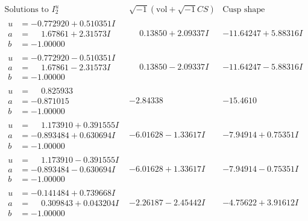 \documentclass[1p]{elsarticle_modified}
\theoremstyle{definition}
\newcommand{\I}{\sqrt{-1}}
\begin{document}
$$\begin{array}{c|c|c}  
\text{Solutions to }I^u_{2}& \I (\text{vol} + \sqrt{-1}CS) & \text{Cusp shape}\\
 \hline 
\begin{aligned}
u &= -0.772920 + 0.510351 I \\
a &= \phantom{-}1.67861 + 2.31573 I \\
b &= -1.00000\phantom{ +0.000000I}\end{aligned}
 & \phantom{-}0.13850 + 2.09337 I & -11.64247 + 5.88316 I \\ \hline\begin{aligned}
u &= -0.772920 - 0.510351 I \\
a &= \phantom{-}1.67861 - 2.31573 I \\
b &= -1.00000\phantom{ +0.000000I}\end{aligned}
 & \phantom{-}0.13850 - 2.09337 I & -11.64247 - 5.88316 I \\ \hline\begin{aligned}
u &= \phantom{-}0.825933\phantom{ +0.000000I} \\
a &= -0.871015\phantom{ +0.000000I} \\
b &= -1.00000\phantom{ +0.000000I}\end{aligned}
 & -2.84338\phantom{ +0.000000I} & -15.4610\phantom{ +0.000000I} \\ \hline\begin{aligned}
u &= \phantom{-}1.173910 + 0.391555 I \\
a &= -0.893484 + 0.630694 I \\
b &= -1.00000\phantom{ +0.000000I}\end{aligned}
 & -6.01628 - 1.33617 I & -7.94914 + 0.75351 I \\ \hline\begin{aligned}
u &= \phantom{-}1.173910 - 0.391555 I \\
a &= -0.893484 - 0.630694 I \\
b &= -1.00000\phantom{ +0.000000I}\end{aligned}
 & -6.01628 + 1.33617 I & -7.94914 - 0.75351 I \\ \hline\begin{aligned}
u &= -0.141484 + 0.739668 I \\
a &= \phantom{-}0.309843 + 0.043204 I \\
b &= -1.00000\phantom{ +0.000000I}\end{aligned}
 & -2.26187 - 2.45442 I & -4.75622 + 3.91612 I \\ \hline\begin{aligned}

\end{aligned}
\end{array}$$
\end{document}
